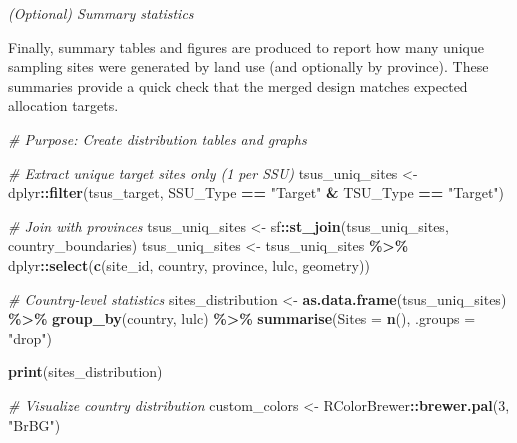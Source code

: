 \documentclass[
  10pt,
  b5paper,
  oneside]{book}
\newenvironment{Shaded}{\begin{snugshade}}{\end{snugshade}}
\newcommand{\AttributeTok}[1]{\textcolor[rgb]{0.13,0.29,0.53}{#1}}
\newcommand{\CommentTok}[1]{\textcolor[rgb]{0.56,0.35,0.01}{\textit{#1}}}
\newcommand{\DecValTok}[1]{\textcolor[rgb]{0.00,0.00,0.81}{#1}}
\newcommand{\FunctionTok}[1]{\textcolor[rgb]{0.13,0.29,0.53}{\textbf{#1}}}
\newcommand{\NormalTok}[1]{#1}
\newcommand{\OtherTok}[1]{\textcolor[rgb]{0.56,0.35,0.01}{#1}}
\newcommand{\SpecialCharTok}[1]{\textcolor[rgb]{0.81,0.36,0.00}{\textbf{#1}}}
\newcommand{\StringTok}[1]{\textcolor[rgb]{0.31,0.60,0.02}{#1}}
\begin{document}
\emph{(Optional) Summary statistics}

Finally, summary tables and figures are produced to report how many unique sampling sites were generated by land use (and optionally by province). These summaries provide a quick check that the merged design matches expected allocation targets.

\begin{Shaded}
\begin{Highlighting}[]
\CommentTok{\# Purpose: Create distribution tables and graphs}

\CommentTok{\# Extract unique target sites only (1 per SSU)}
\NormalTok{tsus\_uniq\_sites }\OtherTok{\textless{}{-}}\NormalTok{ dplyr}\SpecialCharTok{::}\FunctionTok{filter}\NormalTok{(tsus\_target, }
\NormalTok{                                 SSU\_Type }\SpecialCharTok{==} \StringTok{"Target"} \SpecialCharTok{\&}\NormalTok{ TSU\_Type }\SpecialCharTok{==} \StringTok{"Target"}\NormalTok{)}

\CommentTok{\# Join with provinces}
\NormalTok{tsus\_uniq\_sites }\OtherTok{\textless{}{-}}\NormalTok{ sf}\SpecialCharTok{::}\FunctionTok{st\_join}\NormalTok{(tsus\_uniq\_sites, country\_boundaries)}
\NormalTok{tsus\_uniq\_sites }\OtherTok{\textless{}{-}}\NormalTok{ tsus\_uniq\_sites }\SpecialCharTok{\%\textgreater{}\%}
\NormalTok{  dplyr}\SpecialCharTok{::}\FunctionTok{select}\NormalTok{(}\FunctionTok{c}\NormalTok{(site\_id, country, province, lulc, geometry))}

\CommentTok{\# Country{-}level statistics}
\NormalTok{sites\_distribution }\OtherTok{\textless{}{-}} \FunctionTok{as.data.frame}\NormalTok{(tsus\_uniq\_sites) }\SpecialCharTok{\%\textgreater{}\%}
  \FunctionTok{group\_by}\NormalTok{(country, lulc) }\SpecialCharTok{\%\textgreater{}\%}
  \FunctionTok{summarise}\NormalTok{(}\AttributeTok{Sites =} \FunctionTok{n}\NormalTok{(), }\AttributeTok{.groups =} \StringTok{"drop"}\NormalTok{)}

\FunctionTok{print}\NormalTok{(sites\_distribution)}

\CommentTok{\# Visualize country distribution}
\NormalTok{custom\_colors }\OtherTok{\textless{}{-}}\NormalTok{ RColorBrewer}\SpecialCharTok{::}\FunctionTok{brewer.pal}\NormalTok{(}\DecValTok{3}\NormalTok{, }\StringTok{"BrBG"}\NormalTok{)}


\end{Highlighting}
\end{Shaded}
\end{document}
